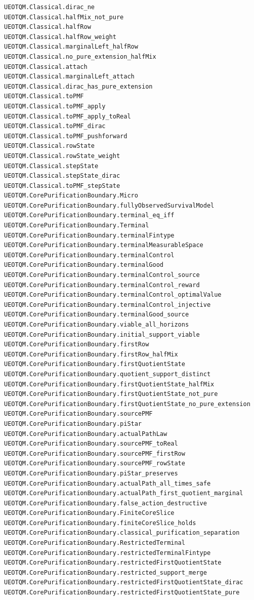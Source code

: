 \documentclass[
  11pt,
  oneside]{book}
\begin{document}
\begin{Verbatim}[breaklines,breakanywhere,fontsize=\scriptsize]
UEOTQM.Classical.dirac_ne
UEOTQM.Classical.halfMix_not_pure
UEOTQM.Classical.halfRow
UEOTQM.Classical.halfRow_weight
UEOTQM.Classical.marginalLeft_halfRow
UEOTQM.Classical.no_pure_extension_halfMix
UEOTQM.Classical.attach
UEOTQM.Classical.marginalLeft_attach
UEOTQM.Classical.dirac_has_pure_extension
UEOTQM.Classical.toPMF
UEOTQM.Classical.toPMF_apply
UEOTQM.Classical.toPMF_apply_toReal
UEOTQM.Classical.toPMF_dirac
UEOTQM.Classical.toPMF_pushforward
UEOTQM.Classical.rowState
UEOTQM.Classical.rowState_weight
UEOTQM.Classical.stepState
UEOTQM.Classical.stepState_dirac
UEOTQM.Classical.toPMF_stepState
UEOTQM.CorePurificationBoundary.Micro
UEOTQM.CorePurificationBoundary.fullyObservedSurvivalModel
UEOTQM.CorePurificationBoundary.terminal_eq_iff
UEOTQM.CorePurificationBoundary.Terminal
UEOTQM.CorePurificationBoundary.terminalFintype
UEOTQM.CorePurificationBoundary.terminalMeasurableSpace
UEOTQM.CorePurificationBoundary.terminalControl
UEOTQM.CorePurificationBoundary.terminalGood
UEOTQM.CorePurificationBoundary.terminalControl_source
UEOTQM.CorePurificationBoundary.terminalControl_reward
UEOTQM.CorePurificationBoundary.terminalControl_optimalValue
UEOTQM.CorePurificationBoundary.terminalControl_injective
UEOTQM.CorePurificationBoundary.terminalGood_source
UEOTQM.CorePurificationBoundary.viable_all_horizons
UEOTQM.CorePurificationBoundary.initial_support_viable
UEOTQM.CorePurificationBoundary.firstRow
UEOTQM.CorePurificationBoundary.firstRow_halfMix
UEOTQM.CorePurificationBoundary.firstQuotientState
UEOTQM.CorePurificationBoundary.quotient_support_distinct
UEOTQM.CorePurificationBoundary.firstQuotientState_halfMix
UEOTQM.CorePurificationBoundary.firstQuotientState_not_pure
UEOTQM.CorePurificationBoundary.firstQuotientState_no_pure_extension
UEOTQM.CorePurificationBoundary.sourcePMF
UEOTQM.CorePurificationBoundary.piStar
UEOTQM.CorePurificationBoundary.actualPathLaw
UEOTQM.CorePurificationBoundary.sourcePMF_toReal
UEOTQM.CorePurificationBoundary.sourcePMF_firstRow
UEOTQM.CorePurificationBoundary.sourcePMF_rowState
UEOTQM.CorePurificationBoundary.piStar_preserves
UEOTQM.CorePurificationBoundary.actualPath_all_times_safe
UEOTQM.CorePurificationBoundary.actualPath_first_quotient_marginal
UEOTQM.CorePurificationBoundary.false_action_destructive
UEOTQM.CorePurificationBoundary.FiniteCoreSlice
UEOTQM.CorePurificationBoundary.finiteCoreSlice_holds
UEOTQM.CorePurificationBoundary.classical_purification_separation
UEOTQM.CorePurificationBoundary.RestrictedTerminal
UEOTQM.CorePurificationBoundary.restrictedTerminalFintype
UEOTQM.CorePurificationBoundary.restrictedFirstQuotientState
UEOTQM.CorePurificationBoundary.restricted_support_merge
UEOTQM.CorePurificationBoundary.restrictedFirstQuotientState_dirac
UEOTQM.CorePurificationBoundary.restrictedFirstQuotientState_pure
\end{Verbatim}
\end{document}
